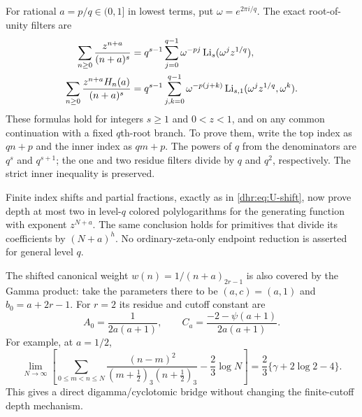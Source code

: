 For rational $a=p/q\in(0,1]$ in lowest terms, put
$\omega=e^{2\pi i/q}$. The exact root-of-unity filters are
\begin{align}
 \sum_{n\geq0}\frac{z^{n+a}}{(n+a)^s}
 &=q^{s-1}\sum_{j=0}^{q-1}\omega^{-pj}
                       \operatorname{Li}_s(\omega^jz^{1/q}),
 \label{dhr:eq:single-filter}\\
 \sum_{n\geq0}\frac{z^{n+a}H_n(a)}{(n+a)^s}
 &=q^{s-1}\sum_{j,k=0}^{q-1}\omega^{-p(j+k)}
             \operatorname{Li}_{s,1}(\omega^jz^{1/q},\omega^k).
 \label{dhr:eq:double-filter}
\end{align}
These formulas hold for integers $s\geq1$ and $0<z<1$, and on any
common continuation with a fixed $q$th-root branch. To prove them,
write the top index as $qn+p$ and the inner index as $qm+p$.
The powers of $q$ from the denominators are $q^s$ and $q^{s+1}$;
the one and two residue filters divide by $q$ and $q^2$,
respectively. The strict inner inequality is preserved.

Finite index shifts and partial fractions, exactly as in
\eqref{dhr:eq:U-shift}, now prove depth at most two in level-$q$
colored polylogarithms for the generating function with exponent
$z^{N+a}$. The same conclusion holds for primitives that divide
its coefficients by $(N+a)^h$. No ordinary-zeta-only endpoint
reduction is asserted for general level $q$.

The shifted canonical weight $w(n)=1/(n+a)_{2r-1}$ is also covered
by the Gamma product: take the parameters there to be $(a,c)=(a,1)$
and $b_0=a+2r-1$. For $r=2$ its residue and cutoff constant are
\begin{equation}\label{dhr:eq:translated-cutoff-constant}
 A_0=\frac1{2a(a+1)},\qquad
 C_a=\frac{-2-\psi(a+1)}{2a(a+1)}.
\end{equation}
For example, at $a=1/2$,
\begin{equation}\label{dhr:eq:half-cutoff}
 \lim_{N\to\infty}\left[
 \sum_{0\leq m<n\leq N}
 \frac{(n-m)^2}{(m+\tfrac12)_3(n+\tfrac12)_3}
       -\frac23\log N\right]
 =\frac23\{\gamma+2\log2-4\}.
\end{equation}
This gives a direct digamma/cyclotomic bridge without changing the
finite-cutoff depth mechanism.
